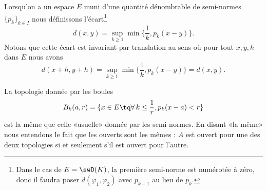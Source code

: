 Lorsqu'on a un espace \( E\) muni d'une quantité dénombrable de semi-normes \( \{ p_k \}_{k\in I}\) nous définissons l'écart\footnote{Dans le cas de \( E=\swD(K)\), la première semi-norme est numérotée à zéro, donc il faudra poser \( d(\varphi_1,\varphi_2)\) avec \( p_{k-1}\) au lieu de \( p_k\).}
\begin{equation}        \label{EqAAghiUR}
    d(x,y)=\sup_{k\geq 1}\min\big\{  \frac{1}{ k },p_k(x-y) \big\}.
\end{equation}
Notons que cette écart est invariant par translation au sens où pour tout \( x,y,h\) dans \( E\) nous avons
\begin{equation}
    d(x+h,y+h)=\sup_{k\geq 1}\min\big\{ \frac{1}{ k },p_k(x-y) \big\}=d(x,y).
\end{equation}

\begin{proposition} \label{PropLOwUvCO}
    La topologie donnée par les boules 
    \begin{equation}    \label{EqGHfYIlQ}
        B_k(a,r)=\{ x\in E\tq \forall\,k\leq \frac{1}{ r },p_k(x-a)<r\}
    \end{equation}
    est la même que celle «usuelle» donnée par les semi-normes. En disant «la même» nous entendons le fait que les ouverts sont les mêmes : \( A\) est ouvert pour une des deux topologies si et seulement s'il est ouvert pour l'autre.
\end{proposition}

